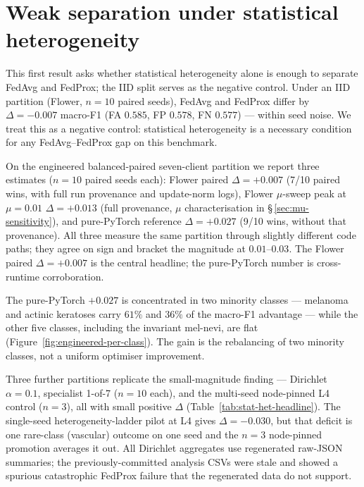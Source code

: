 \documentclass[11pt,a4paper]{report}
\begin{document}
\section{Weak separation under statistical heterogeneity}
\label{sec:statistical-heterogeneity}

This first result asks whether statistical heterogeneity alone is enough to
separate FedAvg and FedProx; the IID split serves as the negative control.
Under an IID partition (Flower, $n=10$ paired seeds), FedAvg and FedProx
differ by $\Delta = -0.007$ macro-F1 (FA $0.585$, FP $0.578$, FN $0.577$) ---
within seed noise. We treat this as a negative control: statistical
heterogeneity is a necessary condition for any FedAvg--FedProx gap on this
benchmark.

On the engineered balanced-paired seven-client partition we report three
estimates ($n=10$ paired seeds each): Flower paired $\Delta = +0.007$ (7/10
paired wins, with full run provenance and update-norm logs), Flower $\mu$-sweep
peak at $\mu = 0.01$ $\Delta = +0.013$ (full provenance, $\mu$ characterisation
in \S\,\ref{sec:mu-sensitivity}), and pure-PyTorch reference $\Delta = +0.027$
(9/10 wins, without that provenance). All three measure the same partition through
slightly different code paths; they agree on sign and bracket the magnitude
at $0.01$--$0.03$. The Flower paired $\Delta = +0.007$ is the central
headline; the pure-PyTorch number is cross-runtime corroboration.

The pure-PyTorch $+0.027$ is concentrated in two minority classes --- melanoma
and actinic keratoses carry $61\%$ and $36\%$ of the macro-F1 advantage --- while
the other five classes, including the invariant mel-nevi, are flat
(Figure~\ref{fig:engineered-per-class}). The gain is the rebalancing of two
minority classes, not a uniform optimiser improvement.

Three further partitions replicate the small-magnitude finding --- Dirichlet
$\alpha = 0.1$, specialist 1-of-7 ($n=10$ each), and the multi-seed node-pinned L4
control ($n=3$), all with small positive $\Delta$
(Table~\ref{tab:stat-het-headline}). The single-seed
heterogeneity-ladder pilot at L4 gives $\Delta = -0.030$, but that deficit is one
rare-class (vascular) outcome on one seed and the $n=3$ node-pinned promotion
averages it out. All Dirichlet aggregates use regenerated raw-JSON summaries; the
previously-committed analysis CSVs were stale and showed a spurious catastrophic
FedProx failure that the regenerated data do not support.
\end{document}
